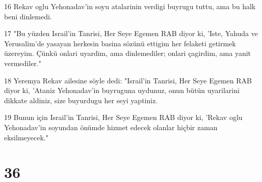 \par 16 Rekav oglu Yehonadav'in soyu atalarinin verdigi buyrugu tuttu, ama bu halk beni dinlemedi.
\par 17 "Bu yüzden Israil'in Tanrisi, Her Seye Egemen RAB diyor ki, 'Iste, Yahuda ve Yerusalim'de yasayan herkesin basina sözünü ettigim her felaketi getirmek üzereyim. Çünkü onlari uyardim, ama dinlemediler; onlari çagirdim, ama yanit vermediler."
\par 18 Yeremya Rekav ailesine söyle dedi: "Israil'in Tanrisi, Her Seye Egemen RAB diyor ki, 'Ataniz Yehonadav'in buyruguna uydunuz, onun bütün uyarilarini dikkate aldiniz, size buyurdugu her seyi yaptiniz.
\par 19 Bunun için Israil'in Tanrisi, Her Seye Egemen RAB diyor ki, 'Rekav oglu Yehonadav'in soyundan önümde hizmet edecek olanlar hiçbir zaman eksilmeyecek."

\chapter{36}

